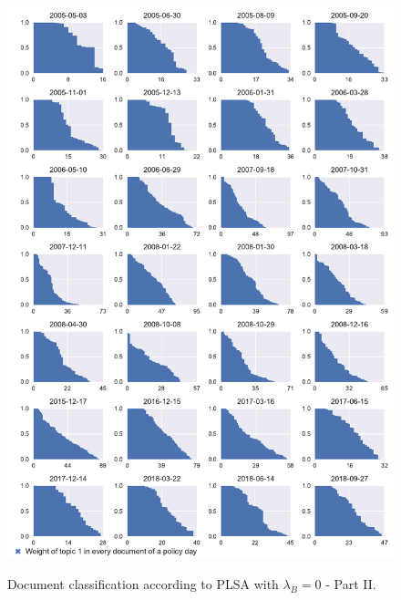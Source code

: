 \documentclass[11pt,a4paper,english,oneside]{book}
\numberwithin{equation}{chapter}
\begin{document}
\begin{figure}
	\caption{Document classification according to PLSA with $\lambda_B = 0$ - Part II.}
	\centering
	\includegraphics[scale=0.8]{Images/docsplit02_bgLamb_0_0}
	\label{classdoc02}
\end{figure}
\end{document}

